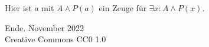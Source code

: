 \documentclass[8pt]{beamer}
\newcommand{\modest}[1]{{\small\color{gray}#1}}
\newcommand{\parspace}{\vspace{0.8em}}
\begin{document}
\begin{frame}[t]
{\parspace
Hier ist $a$ mit $A\land P(a)$ ein Zeuge für $\exists x\colon A\land P(x)$.
}
\end{frame}

\begin{frame}
Ende.
\vfill\hfill\modest{November 2022}\\
\hfill\modest{Creative Commons CC0 1.0}
\end{frame}
\end{document}
